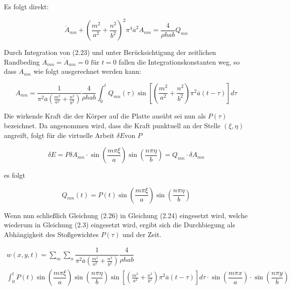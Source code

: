 Es folgt direkt:

\begin{equation}
\ddot{A}_{mn} + \left(\dfrac{m^2}{a^2} + \dfrac{n^2}{b^2}\right)^2 \pi^4 \overline{a}^2 A_{mn} = \dfrac{4}{\rho h a b} Q_{mn}
\end{equation}


Durch Integration von (2.23) und unter Berücksichtigung der zeitlichen Randbeding $A_{mn} = \dot{A}_{mn} = 0 \text{ für } t = 0$ fallen die Integrationskonstanten weg, so dass $A_{mn}$ wie folgt ausgerechnet werden kann:

\begin{equation}
A_{mn} = \dfrac{1}{\pi^2 \overline{a}  \left(\frac{m^2}{a^2} + \frac{n^2}{b^2} \right)} \dfrac{4}{\rho h a b} \int_0^t	Q_{mn}(\tau) \sin \left[ \left(\frac{m^2}{a^2} + \frac{n^2}{b^2} \right) \pi^2 \overline{a} (t-\tau)\right] d\tau
\end{equation}


Die wirkende Kraft die der Körper auf die Platte ausübt sei nun als $P(\tau)$ bezeichnet. 
Da angenommen wird, dass die Kraft punktuell an der Stelle $(\xi, \eta)$ angreift, folgt für die virtuelle Arbeit $\delta E$von $P$

\begin{equation}
\delta E = P \delta A_{mn} \cdot \sin \left( \dfrac{m \pi \xi}{a} \right) \sin \left( \dfrac{n \pi \eta}{b} \right) = Q_{mn} \cdot \delta A_{mn}
\end{equation} 

es folgt

\begin{equation}
Q_{mn}(t) = P(t) \sin \left( \dfrac{m \pi \xi}{a} \right) \sin \left( \dfrac{n \pi \eta}{b} \right)
\end{equation}



Wenn nun schließlich Gleichung (2.26) in Gleichung (2.24) eingesetzt wird, welche wiederum in Gleichung (2.3) eingesetzt wird, ergibt sich die Durchbiegung als Abhängigkeit des Stoßgewichtes $P(\tau)$ und der Zeit.

\begin{multline}
w(x,y,t) = \sum_m \sum_n 
\dfrac{1}{\pi^2 \overline{a}  \left(\frac{m^2}{a^2} + \frac{n^2}{b^2} \right)} \dfrac{4}{\rho h a b} \\ \int_0^t
 P(t) \sin \left( \dfrac{m \pi \xi}{a} \right) \sin \left( \dfrac{n \pi \eta}{b} \right)
\sin \left[ \left(\frac{m^2}{a^2} + \frac{n^2}{b^2} \right) \pi^2 \overline{a} (t-\tau)\right] d\tau
\cdot \sin\left(\dfrac{m \pi x}{a}\right) \cdot \sin\left(\dfrac{n \pi y}{b}\right)
\end{multline}

